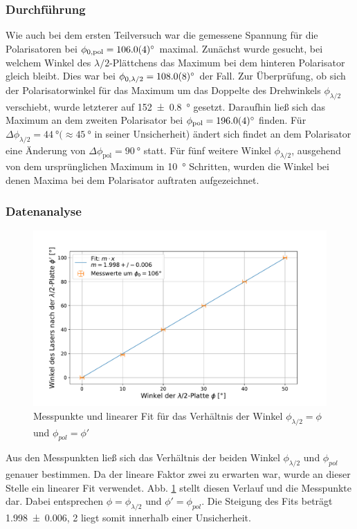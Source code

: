 	\subsubsection*{Durchführung}
	
		Wie auch bei dem ersten Teilversuch war die gemessene Spannung für die Polarisatoren bei $\phi_{0,\text{pol}} = \SI{106+-0,4}{\degree}$ maximal.
		Zunächst wurde gesucht, bei welchem Winkel des $\lambda/2$-Plättchens das Maximum bei dem hinteren Polarisator gleich bleibt.
		Dies war bei $\phi_{0,\lambda/2} = \SI{108+-0,8}{\degree}$ der Fall.
		Zur Überprüfung, ob sich der Polarisatorwinkel für das Maximum um das Doppelte des Drehwinkels $\phi_{\lambda/2}$ verschiebt, wurde letzterer auf \SI{152+-0,8}{\degree} gesetzt.
		Daraufhin ließ sich das Maximum an dem zweiten Polarisator bei $\phi_{\text{pol}} = \SI{196+-0,4}{\degree}$ finden.
		Für $\Delta\phi_{\lambda/2} = \SI{44}{\degree} (\approx \SI{45}{\degree}$ in seiner Unsicherheit) ändert sich findet an dem Polarisator eine Änderung von $\Delta\phi_{\text{pol}} = \SI{90}{\degree}$ statt.
		Für fünf weitere Winkel $\phi_{\lambda/2}$, ausgehend von dem ursprünglichen Maximum in \SI{10}{\degree} Schritten, wurden die Winkel bei denen Maxima bei dem Polarisator auftraten aufgezeichnet.
	
	\subsubsection*{Datenanalyse}
		
		\begin{figure}[ht]
			\centering
			\includegraphics[width=\textwidth]{data/lambdaPolarisation.pdf}
			\caption{Messpunkte und linearer Fit für das Verhältnis der Winkel $\phi_{\lambda/2} = \phi$ und $\phi_{pol}=\phi'$}
			\label{fig:LambdaHalbeFit}	
		\end{figure}
		Aus den Messpunkten ließ sich das Verhältnis der beiden Winkel $\phi_{\lambda/2}$ und $\phi_{pol}$ genauer bestimmen.
		Da der lineare Faktor zwei zu erwarten war, wurde an dieser Stelle ein linearer Fit verwendet.
		Abb. \ref{fig:LambdaHalbeFit} stellt diesen Verlauf und die Messpunkte dar.
		Dabei entsprechen $\phi = \phi_{\lambda/2}$ und $\phi' = \phi_{pol}$.
		Die Steigung des Fits beträgt \SI{1,998+-0,006}{}, 2 liegt somit innerhalb einer Unsicherheit.
	
